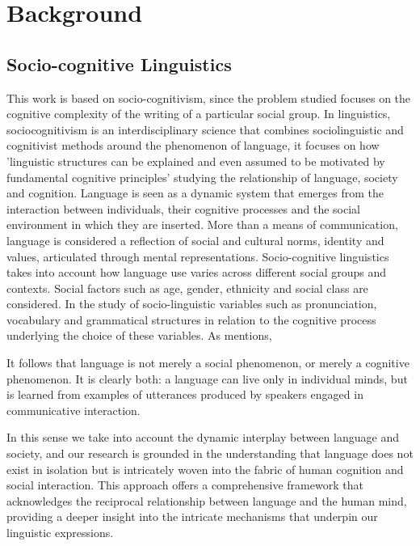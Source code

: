 \documentclass[final]{clv3} %
\begin{document}
\section{Background}

\subsection{Socio-cognitive Linguistics}

This work is based on socio-cognitivism, since the problem studied focuses on the cognitive complexity of the writing of a particular social group. In linguistics, sociocognitivism is an interdisciplinary science that combines sociolinguistic and cognitivist methods around the phenomenon of language, it focuses on how 'linguistic structures can be explained and even assumed to be motivated by fundamental cognitive principles' \citep*[p.~544]{schmid2016cognitive} studying the relationship of language, society and cognition. Language is seen as a dynamic system that emerges from the interaction between individuals, their cognitive processes and the social environment in which they are inserted. More than a means of communication, language is considered a reflection of social and cultural norms, identity and values, articulated through mental representations.
Socio-cognitive linguistics takes into account how language use varies across different social groups and contexts. Social factors such as age, gender, ethnicity and social class are considered. In the study of socio-linguistic variables such as pronunciation, vocabulary and grammatical structures in relation to the cognitive process underlying the choice of these variables.
As \citet{dkabrowska2020language} mentions,
\begin{extract}
It follows that language is not merely a social phenomenon, or merely a cognitive phenomenon. It is clearly both: a language can live only in individual minds, but is learned from examples of utterances produced by speakers engaged in communicative interaction. \citep*[p.~224]{dkabrowska2020language}
\end{extract}
In this sense we take into account the dynamic interplay between language and society, and our research is grounded in the understanding that language does not exist in isolation but is intricately woven into the fabric of human cognition and social interaction. This approach offers a comprehensive framework that acknowledges the reciprocal relationship between language and the human mind, providing a deeper insight into the intricate mechanisms that underpin our linguistic expressions.
\end{document}
